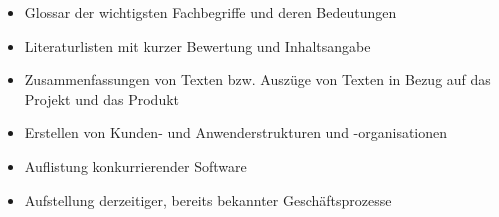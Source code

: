 \begin{itemize}
    \item Glossar der wichtigsten Fachbegriffe und deren Bedeutungen
    \item Literaturlisten mit kurzer Bewertung und Inhaltsangabe
    \item Zusammenfassungen von Texten bzw. Auszüge von Texten in Bezug auf das Projekt und das Produkt
    \item Erstellen von Kunden- und Anwenderstrukturen und -organisationen
    \item Auflistung konkurrierender Software
    \item Aufstellung derzeitiger, bereits bekannter Geschäftsprozesse
\end{itemize}